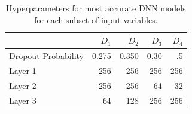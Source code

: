 \documentclass{article} %
\begin{document}
\begin{table}
\begin{tabularx}{\linewidth}{l r r r r}
		\toprule[.2em]
		 &{\bf $D_1$}& {\bf $D_2$}&{\bf $D_3$}&{\bf $D_4$}\\
		\midrule
		Dropout Probability&0.275&0.350& 0.30&.5\\
		Layer 1&256&256& 256&256\\
		Layer 2&256&256&64&32\\
		Layer 3&64&128&256&256\\
		\bottomrule[.2em]
	\end{tabularx}
	\caption{Hyperparameters for most accurate DNN models for each subset of input variables.} \label{tab:dnnhyper}
\end{table}
\end{document}
